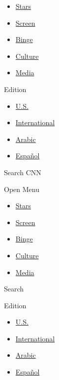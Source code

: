 \begin{itemize}
\tightlist
\item
  \href{/entertainment/celebrities}{Stars}
\item
  \href{/entertainment/movies}{Screen}
\item
  \href{/entertainment/tv-shows}{Binge}
\item
  \href{/entertainment/culture}{Culture}
\item
  \href{/business/media}{Media}
\end{itemize}

Edition

\begin{itemize}
\tightlist
\item
  \href{//us.cnn.com?hpt=header_edition-picker}{U.S.}
\item
  \href{//edition.cnn.com?hpt=header_edition-picker}{International}
\item
  \href{//arabic.cnn.com?hpt=header_edition-picker}{Arabic}
\item
  \href{//cnnespanol.cnn.com?hpt=header_edition-picker}{Español}
\end{itemize}

Search CNN

Open Menu

\begin{itemize}
\tightlist
\item
  \href{/entertainment/celebrities}{Stars}
\item
  \href{/entertainment/movies}{Screen}
\item
  \href{/entertainment/tv-shows}{Binge}
\item
  \href{/entertainment/culture}{Culture}
\item
  \href{/business/media}{Media}
\end{itemize}

Search

Edition

\begin{itemize}
\tightlist
\item
  \href{//us.cnn.com?hpt=header_edition-picker}{U.S.}
\item
  \href{//edition.cnn.com?hpt=header_edition-picker}{International}
\item
  \href{//arabic.cnn.com?hpt=header_edition-picker}{Arabic}
\item
  \href{//cnnespanol.cnn.com?hpt=header_edition-picker}{Español}
\end{itemize}

